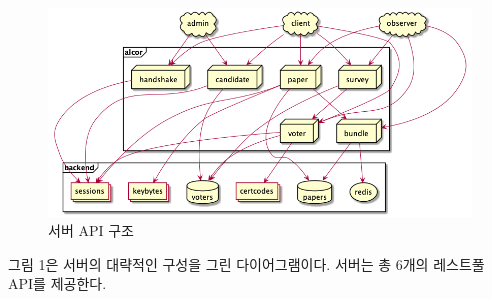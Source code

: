 \documentclass[8pt,a4paper,left=8mm,right=8mm,top=10mm,bottom=10mm]{article}
\begin{document}
\begin{figure}[h]
    \begin{center}
        \includegraphics[width=13cm]{server}
        \caption{서버 API 구조}
    \end{center}
\end{figure}

그림 1은 서버의 대략적인 구성을 그린 다이어그램이다. 서버는 총 6개의 레스트풀 API를 제공한다.
\end{document}
